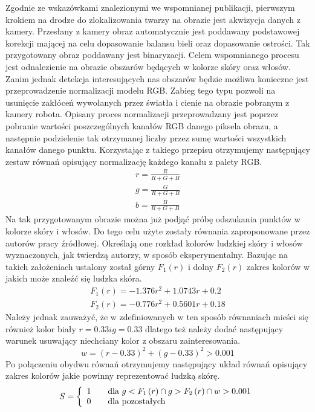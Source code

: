 Zgodnie ze wskazówkami znalezionymi we wspomnianej publikacji, pierwszym krokiem
na drodze do zlokalizowania twarzy na obrazie jest akwizycja danych z kamery.
Przesłany z kamery obraz automatycznie jest poddawany podstawowej korekcji
mającej na celu dopasowanie balansu bieli oraz  dopasowanie ostrości. Tak
przygotowany obraz poddawany jest binaryzacji. Celem wspomnianego procesu jest
odnalezienie na obrazie obszarów będących w kolorze skóry oraz włosów. Zanim
jednak detekcja interesujących nas obszarów będzie możliwa konieczne jest
przeprowadzenie normalizacji modelu RGB. Zabieg tego typu pozwoli na usunięcie
zakłóceń wywołanych przez światła i cienie na obrazie pobranym z kamery robota.
Opisany proces normalizacji przeprowadzany jest poprzez pobranie wartości
poszczególnych kanałów RGB danego piksela obrazu, a następnie podzielenie tak
otrzymanej liczby przez sumę wartości wszystkich kanałów danego punktu.
Korzystając z takiego przepisu otrzymujemy następujący zestaw równań opisujący
normalizację każdego kanału z palety RGB.
\begin{eqnarray}
r = \frac{R}{R + G +B}\\
g = \frac{G}{R + G +B}\\
b = \frac{B}{R + G +B}
\end{eqnarray}
Na tak przygotowanym obrazie można już podjąć próbę odszukania punktów w kolorze
skóry i włosów. Do tego celu użyte zostały równania zaproponowane przez autorów
pracy źródłowej. Określają one rozkład kolorów ludzkiej skóry i włosów
wyznaczonych, jak twierdzą autorzy, w sposób eksperymentalny. Bazując na takich
założeniach ustalony został górny $F_1(r)$ i dolny $F_2(r)$ zakres kolorów w
jakich może znaleźć się ludzka skóra.
\begin{eqnarray}
F_1\left(r\right) = -1.376r^2 + 1.0743r + 0.2\\
F_2\left(r\right) = -0.776r^2 + 0.5601r + 0.18
\end{eqnarray}
Należy jednak zauważyć, że w zdefiniowanych w ten sposób równaniach mieści się
również kolor biały $r = 0.33 i g = 0.33$ dlatego też należy dodać następujący
warunek usuwający niechciany kolor z obszaru zainteresowania.
\begin{equation}
w = \left(r - 0.33\right)^2 + \left(g - 0.33\right)^2 > 0.001
\end{equation}
Po połączeniu obydwu równań otrzymujemy następujący układ równań opisujący
zakres kolorów jakie powinny reprezentować ludzką skórę. 
\begin{equation}
S = \left\{ 
\begin{array}{l l}
  1 & \quad \mbox{dla $g < F_1\left(r\right) \cap g > F_2\left(r\right) \cap w
  > 0.001$}\\ 0 & \quad \mbox{dla pozostałych}\\ \end{array} \right. 
  \label{skinEq1}
\end{equation}
